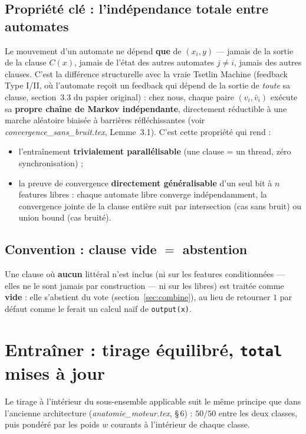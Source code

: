 \documentclass[12pt,a4paper]{article}
\newcommand{\vbar}{\bar{v}}
\newcommand{\code}[1]{\texttt{#1}}
\theoremstyle{remark}
\begin{document}
\subsection{Propriété clé : l'indépendance totale entre automates}

Le mouvement d'un automate ne dépend \textbf{que} de $(x_i,y)$ ---
jamais de la sortie de la clause $C(x)$, jamais de l'état des autres
automates $j\ne i$, jamais des autres clauses. C'est la différence
structurelle avec la vraie Tsetlin Machine (feedback Type I/II, où
l'automate reçoit un feedback qui dépend de la sortie de \emph{toute} sa
clause, section~3.3 du papier original) : chez nous, chaque paire
$(v_i,\vbar_i)$ exécute sa \textbf{propre chaîne de Markov indépendante},
directement réductible à une marche aléatoire biaisée à barrières
réfléchissantes (voir \emph{convergence\_sans\_bruit.tex}, Lemme~3.1). C'est
cette propriété qui rend :
\begin{itemize}
  \item l'entraînement \textbf{trivialement parallélisable} (une clause =
        un thread, zéro synchronisation) ;
  \item la preuve de convergence \textbf{directement généralisable} d'un
        seul bit à $n$ features libres : chaque automate libre converge
        indépendamment, la convergence jointe de la clause entière suit par
        intersection (cas sans bruit) ou union bound (cas bruité).
\end{itemize}

\subsection{Convention : clause vide $=$ abstention}

Une clause où \textbf{aucun} littéral n'est inclus (ni sur les features
conditionnées --- elles ne le sont jamais par construction --- ni sur les
libres) est traitée comme \textbf{vide} : elle s'abstient du vote
(section~\ref{sec:combine}), au lieu de retourner $1$ par défaut comme le
ferait un calcul naïf de \code{output(x)}.

\section{Entraîner : tirage équilibré, \code{total} mises à jour}

Le tirage à l'intérieur du sous-ensemble applicable suit le même principe que
dans l'ancienne architecture (\emph{anatomie\_moteur.tex}, \S\,6) : $50/50$
entre les deux classes, puis pondéré par les poids $w$ courants à
l'intérieur de chaque classe.
\end{document}
